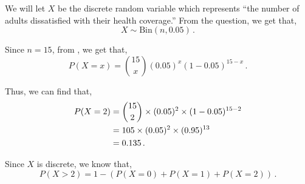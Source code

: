 %
%


\begin{subquestions}
	
\subquestion

\begin{subsubquestions}
	
\subsubquestion

\begin{subsubsubquestions}
	
\subsubsubquestion

We will let $X$ be the discrete random variable which represents ``the number of adults dissatisfied with their health coverage.'' From the question,  we get that,
\begin{equation}
	X \sim \text{Bin}(n, 0.05) \,.
\end{equation}
	
Since $n=15$, from , we get that,
\begin{equation}
	P(X = x) = { 15 \choose x} (0.05)^x (1-0.05)^{15-x} \,.
\end{equation}

Thus, we can find that,
\begin{align}
	P(X=2) & = { 15 \choose 2} \times (0.05)^2 \times (1-0.05)^{15-2} \nonumber \\
	       & = 105 \times (0.05)^2 \times (0.95)^{13} \nonumber \\
	       & = 0.135 \,.
\end{align}


\subsubsubquestion

Since $X$ is discrete, we know that,
\begin{equation}
	P(X>2) = 1 - (P(X=0)+P(X=1)+P(X=2)) \,.
\end{equation}


\end{subsubsubquestions}
\end{subsubquestions}
\end{subquestions}
